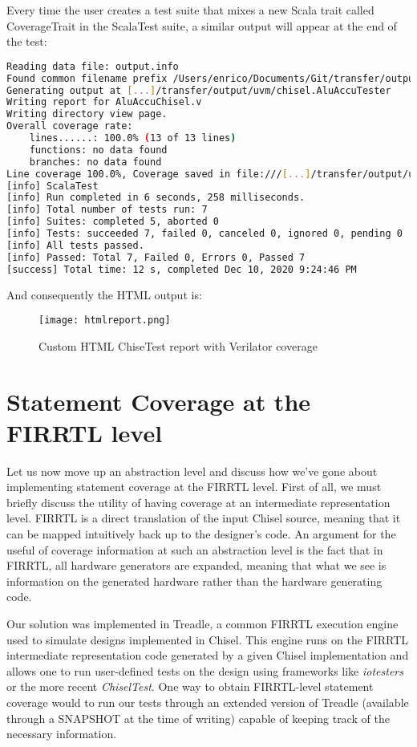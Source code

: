 \documentclass[conference]{IEEEtran}
\begin{document}
Every time the user creates a test suite that mixes a new Scala trait called  CoverageTrait in the ScalaTest suite, a similar output will appear at the end of the test:
\begin{lstlisting}[language=bash]
Reading data file: output.info
Found common filename prefix /Users/enrico/Documents/Git/transfer/output/uvm/
Generating output at [...]/transfer/output/uvm/chisel.AluAccuTester
Writing report for AluAccuChisel.v
Writing directory view page.
Overall coverage rate:
	lines......: 100.0% (13 of 13 lines)
	functions: no data found
	branches: no data found
Line coverage 100.0%, Coverage saved in file:///[...]/transfer/output/uvm/chisel.AluAccuTester/VerilatorCoverage.html
[info] ScalaTest
[info] Run completed in 6 seconds, 258 milliseconds.
[info] Total number of tests run: 7
[info] Suites: completed 5, aborted 0
[info] Tests: succeeded 7, failed 0, canceled 0, ignored 0, pending 0
[info] All tests passed.
[info] Passed: Total 7, Failed 0, Errors 0, Passed 7
[success] Total time: 12 s, completed Dec 10, 2020 9:24:46 PM
\end{lstlisting}

And consequently the HTML output is:

\begin{figure}[htb]
\centering
\texttt{[image: htmlreport.png]}
\caption{Custom HTML ChiseTest report with Verilator coverage}
\label{fig:customhtmlreport}
\end{figure}

\section{Statement Coverage at the FIRRTL level}  
Let us now move up an abstraction level and discuss how we've gone about implementing statement coverage at the FIRRTL level. First of all, we must briefly discuss the utility of having coverage at an intermediate representation level. FIRRTL is a direct translation of the input Chisel source, meaning that it can be mapped intuitively back up to the designer's code. An argument for the useful of coverage information at such an abstraction level is the fact that in FIRRTL, all hardware generators are expanded, meaning that what we see is information on the generated hardware rather than the hardware generating code. 

Our solution was implemented in Treadle, a common FIRRTL execution engine used to simulate designs implemented in Chisel. This engine runs on the FIRRTL intermediate representation code generated by a given Chisel implementation and allows one to run user-defined tests on the design using frameworks like \textit{iotesters} or the more recent \textit{ChiselTest}. One way to obtain FIRRTL-level statement coverage would to run our tests through an extended version of Treadle (available through a SNAPSHOT at the time of writing) capable of keeping track of the necessary information.
\end{document}
